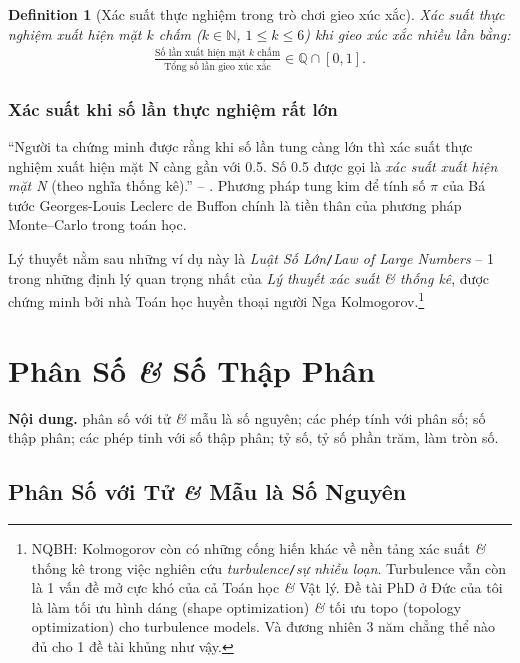 \documentclass{article}
\numberwithin{equation}{section}
\newtheorem{definition}{Definition}[section]
\begin{document}
\begin{definition}[Xác suất thực nghiệm trong trò chơi gieo xúc xắc]
	\emph{Xác suất thực nghiệm xuất hiện mặt $k$ chấm} ($k\in\mathbb{N}$, $1\le k\le 6$) khi gieo xúc xắc nhiều lần bằng:
	\begin{align*}
		\frac{\mbox{Số lần xuất hiện mặt $k$ chấm}}{\mbox{Tổng số lần gieo xúc xắc}}\in\mathbb{Q}\cap[0,1].
	\end{align*}
\end{definition}

\subsubsection{Xác suất khi số lần thực nghiệm rất lớn}
``Người ta chứng minh được rằng khi số lần tung càng lớn thì xác suất thực nghiệm xuất hiện mặt N càng gần với 0.5. Số 0.5 được gọi là \textit{xác suất xuất hiện mặt N} (theo nghĩa thống kê).'' -- \cite[p. 21]{Thai_Anh_Dat_Ha_Loan_Nam_Quang_Toan_6_tap_2}. Phương pháp tung kim để tính số $\pi$ của Bá tước Georges-Louis Leclerc de Buffon chính là tiền thân của phương pháp Monte--Carlo trong toán học.

Lý thuyết nằm sau những ví dụ này là \textit{Luật Số Lớn}\texttt{/}\textit{Law of Large Numbers} -- 1 trong những định lý quan trọng nhất của \textit{Lý thuyết xác suất \textit{\&} thống kê}, được chứng minh bởi nhà Toán học huyền thoại người Nga Kolmogorov.\footnote{NQBH: Kolmogorov còn có những cống hiến khác về nền tảng xác suất \textit{\&} thống kê trong việc nghiên cứu \textit{turbulence}\texttt{/}\textit{sự nhiễu loạn}. Turbulence vẫn còn là 1 vấn đề mở cực khó của cả Toán học \textit{\&} Vật lý. Đề tài PhD ở Đức của tôi là làm tối ưu hình dáng (shape optimization) \textit{\&} tối ưu topo (topology optimization) cho turbulence models. Và đương nhiên 3 năm chẳng thể nào đủ cho 1 đề tài khủng như vậy.}

\section{Phân Số \textit{\&} Số Thập Phân}
\textbf{Nội dung.} phân số với tử \textit{\&} mẫu là số nguyên; các phép tính với phân số; số thập phân; các phép tinh với số thập phân; tỷ số, tỷ số phần trăm, làm tròn số.

\subsection{Phân Số với Tử \textit{\&} Mẫu là Số Nguyên}
\end{document}
